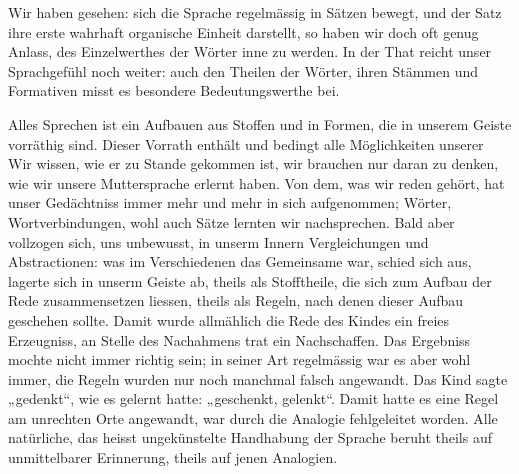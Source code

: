 {Wir haben gesehen:  sich die Sprache regelmässig in Sätzen bewegt, und der Satz ihre erste wahrhaft organische Einheit darstellt, so haben wir doch oft genug Anlass, des Einzelwerthes der Wörter inne zu werden. In der That reicht unser Sprachgefühl noch weiter: auch den Theilen der Wörter, ihren Stämmen und Formativen misst es besondere Bedeutungswerthe bei.

Alles Sprechen ist ein Aufbauen aus Stoffen und in Formen, die in unserem Geiste vorräthig sind. Dieser Vorrath enthält und bedingt alle Möglichkeiten unserer  Wir wissen, wie er zu Stande gekommen ist, wir brauchen nur daran zu denken, wie wir unsere Muttersprache erlernt haben. Von dem, was wir reden gehört, hat unser Gedächtniss immer mehr und mehr in sich aufgenommen; Wörter, Wort\label{fp.211}verbindungen, wohl auch Sätze lernten wir nachsprechen. Bald aber vollzogen sich, uns unbewusst, in unserm Innern Vergleichungen und Abstractionen:  was im Verschiedenen das Gemeinsame war, schied sich aus, lagerte sich in unserm Geiste ab, theils als Stofftheile, die sich zum Aufbau der Rede zusammensetzen liessen, theils als Regeln, nach denen dieser Aufbau geschehen sollte. Damit wurde allmählich die Rede des Kindes ein freies Erzeugniss, an Stelle des Nachahmens trat ein Nachschaffen. Das Ergebniss mochte nicht immer richtig sein; in seiner Art regelmässig war es aber wohl immer, die Regeln wurden nur noch manchmal falsch angewandt. Das Kind sagte „gedenkt“, wie es gelernt hatte: „geschenkt, gelenkt“. Damit hatte es eine Regel am unrechten Orte angewandt, war durch die Analogie fehlgeleitet worden. Alle natürliche, das heisst ungekünstelte Handhabung der Sprache beruht theils auf unmittelbarer Erinnerung, theils auf jenen Analogien.

}
